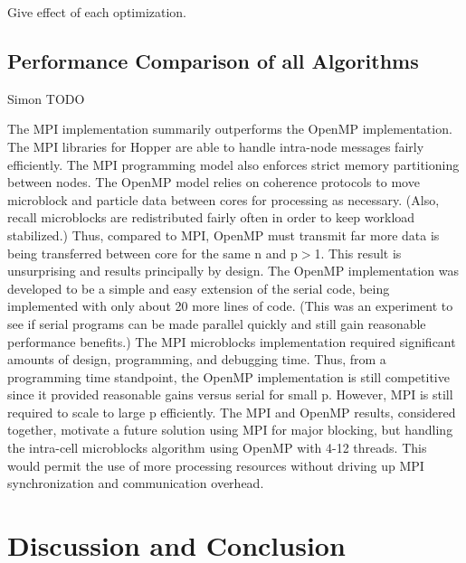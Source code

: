\documentclass[11pt]{article} %
\begin{document}
Give effect of each optimization.

\subsection{Performance Comparison of all Algorithms}

Simon TODO

The MPI implementation summarily outperforms the OpenMP implementation. The MPI libraries for Hopper are able to handle intra-node messages fairly efficiently. The MPI programming model also enforces strict memory partitioning between nodes. The OpenMP model relies on coherence protocols to move microblock and particle data between cores for processing as necessary. (Also, recall microblocks are redistributed fairly often in order to keep workload stabilized.) Thus, compared to MPI, OpenMP must transmit far more data is being transferred between core for the same n and p$>$1. This result is unsurprising and results principally by design. The OpenMP implementation was developed to be a simple and easy extension of the serial code, being implemented with only about 20 more lines of code. (This was an experiment to see if serial programs can be made parallel quickly and still gain reasonable performance benefits.) The MPI microblocks implementation required significant amounts of design, programming, and debugging time. Thus, from a programming time standpoint, the OpenMP implementation is still competitive since it provided reasonable gains versus serial for small p. However, MPI is still required to scale to large p efficiently. The MPI and OpenMP results, considered together, motivate a future solution using MPI for major blocking, but handling the intra-cell microblocks algorithm using OpenMP with 4-12 threads. This would permit the use of more processing resources without driving up MPI synchronization and communication overhead.

\section{Discussion and Conclusion}
\label{conclusion-section}
\end{document}
